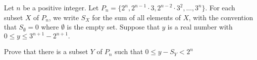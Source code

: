 Let $n$ be a positive integer. Let $P_n=\{2^n,2^{n-1}\cdot 3, 2^{n-2}\cdot 3^2, \dots, 3^n \}.$ For each subset $X$ of $P_n$,  we write $S_X$ for the sum of all elements of $X$,  with the convention that $S_{\emptyset}=0$ where $\emptyset$ is the empty set. Suppose that $y$ is a real number with $0 \leq y \leq 3^{n+1}-2^{n+1}.$

Prove that there is a subset $Y$ of $P_n$ such that  $0 \leq y-S_Y < 2^n$